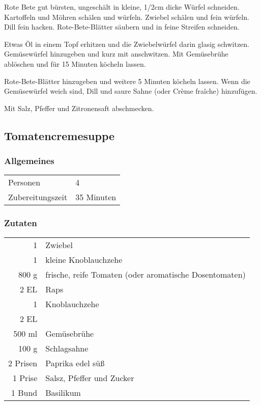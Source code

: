 Rote Bete gut bürsten, ungeschält in kleine, 1/2cm dicke Würfel schneiden. Kartoffeln und Möhren schälen und würfeln. Zwiebel schälen und fein würfeln. Dill fein hacken. Rote-Bete-Blätter säubern und in feine Streifen schneiden.

Etwas Öl in einem Topf erhitzen und die Zwiebelwürfel darin glasig schwitzen. Gemüsewürfel hinzugeben und kurz mit anschwitzen. Mit Gemüsebrühe ablöschen und für 15 Minuten köcheln lassen.

Rote-Bete-Blätter hinzugeben und weitere 5 Minuten köcheln lassen. Wenn die Gemüsewürfel weich sind, Dill und saure Sahne (oder Crème fraîche) hinzufügen.

Mit Salz, Pfeffer und Zitronensaft abschmecken.

\subsection{Tomatencremesuppe}\label{sec:Tomatensuppe cremig}
\subsubsection*{Allgemeines}
\begin{tabular}{ll}
    Personen         &  4   \\
    Zubereitungszeit &  35 Minuten \\
\end{tabular} 
\subsubsection*{Zutaten}
\begin{tabular}{r l}
           1 & Zwiebel                                                \\
           1 & kleine Knoblauchzehe                                   \\
       800 g & frische, reife Tomaten (oder aromatische Dosentomaten) \\
        2 EL & Raps                                                   \\
           1 & Knoblauchzehe                                          \\
        2 EL &                                                        \\
      500 ml & Gemüsebrühe                                            \\
       100 g & Schlagsahne                                            \\
    2 Prisen & Paprika edel süß                                        \\
     1 Prise & Salsz, Pfeffer und Zucker                              \\
      1 Bund & Basilikum
\end{tabular}


